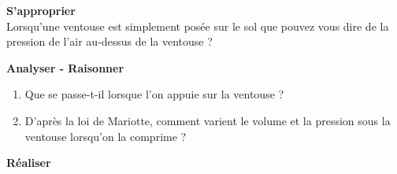 \documentclass[11pt,a4paper]{article}
\newcommand{\cadreblanc}[1]{%
\medskip\framebox[\linewidth][c]{%
\rule{0mm}{#1mm}}\par
\medskip}
\begin{document}
\textbf{ S'approprier} \\

Lorsqu'une ventouse est simplement posée sur le sol que pouvez vous dire de la pression de l'air au-dessus de la ventouse ? \\

\cadreblanc{15}











\textbf{ Analyser - Raisonner} \\
\begin{enumerate}

\item Que se passe-t-il lorsque l'on appuie sur la ventouse ? 

\cadreblanc{15}

\item D'après la loi de Mariotte, comment varient le volume et la pression sous la ventouse lorsqu'on la comprime ? 

\cadreblanc{25}

\end{enumerate}

\newpage

\textbf{ Réaliser} \\[3mm]
\end{document}
